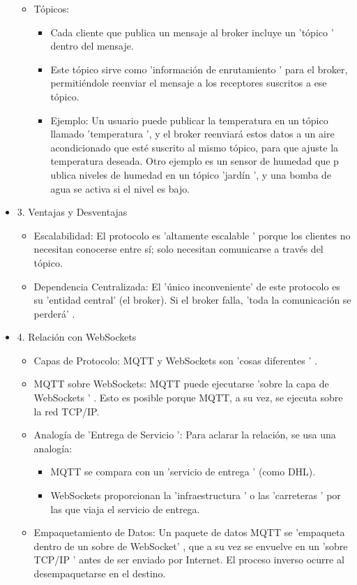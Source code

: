 \documentclass{report}
\begin{document}
\begin{itemize}
\begin{itemize}
        \item Tópicos:
        \begin{itemize}
            \item Cada cliente que publica un mensaje al broker incluye un   'tópico '  dentro del mensaje.
            \item Este tópico sirve como   'información de enrutamiento '  para el broker, permitiéndole reenviar el mensaje a los receptores 
            suscritos a ese tópico.
            \item Ejemplo: Un usuario puede publicar la temperatura en un tópico llamado  'temperatura ', y el broker reenviará estos datos a un 
            aire acondicionado que esté suscrito al mismo tópico, para que ajuste la temperatura deseada. Otro ejemplo es un sensor de humedad que p
            ublica niveles de humedad en un tópico  'jardín ', y una bomba de agua se activa si el nivel es bajo.
        \end{itemize}
    \end{itemize}

    \item 3. Ventajas y Desventajas
    \begin{itemize}
        \item Escalabilidad: El protocolo es 'altamente escalable '  porque los clientes no necesitan conocerse entre sí; solo necesitan comunicarse 
        a través del tópico.
        \item Dependencia Centralizada: El 'único inconveniente'  de este protocolo es su   'entidad central'  (el broker). Si el broker falla, 
        'toda la comunicación se perderá' .
    \end{itemize}

    \item 4. Relación con WebSockets
    \begin{itemize}
        \item Capas de Protocolo: MQTT y WebSockets son  'cosas diferentes ' .
        \item MQTT sobre WebSockets: MQTT puede ejecutarse   'sobre la capa de WebSockets ' . Esto es posible porque MQTT, a su vez, se ejecuta sobre 
        la red TCP/IP.
        \item Analogía de  'Entrega de Servicio ': Para aclarar la relación, se usa una analogía:
        \begin{itemize}
            \item MQTT se compara con un   'servicio de entrega '  (como DHL).
            \item WebSockets proporcionan la   'infraestructura '  o las  'carreteras ' por las que viaja el servicio de entrega.
        \end{itemize}
        \item Empaquetamiento de Datos: Un paquete de datos MQTT se   'empaqueta dentro de un sobre de WebSocket' , que a su vez se envuelve en un  
        'sobre TCP/IP ' antes de ser enviado por Internet. El proceso inverso ocurre al desempaquetarse en el destino.
    \end{itemize}


\end{itemize}
\end{document}

